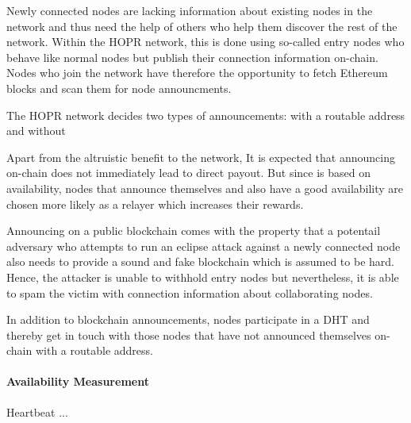 Newly connected nodes are lacking information about existing nodes in the network and thus need the help of others who help them discover the rest of the network. Within the HOPR network, this is done using so-called entry nodes who behave like normal nodes but publish their connection information on-chain. Nodes who join the network have therefore the opportunity to fetch Ethereum blocks and scan them for node announcments.

The HOPR network decides two types of announcements: with a routable address and without

Apart from the altruistic benefit to the network, It is expected that announcing on-chain does not immediately lead to direct payout. But since  is based on availability, nodes that announce themselves and also have a good availability are chosen more likely as a relayer which increases their rewards.

Announcing on a public blockchain comes with the property that a potentail adversary who attempts to run an eclipse attack against a newly connected node also needs to provide a sound and fake blockchain which is assumed to be hard. Hence, the attacker is unable to withhold entry nodes but nevertheless, it is able to spam the victim with connection information about collaborating nodes.

In addition to blockchain announcements, nodes participate in a DHT and thereby get in touch with those nodes that have not announced themselves on-chain with a routable address.

\paragraph{Availability Measurement}

Heartbeat ...